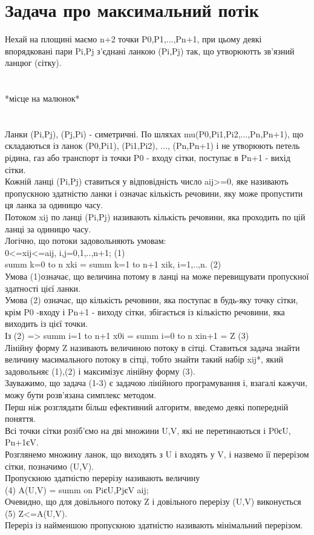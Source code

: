 \documentclass[12pt,a4paper]{book}
\begin{document}
\section{Задача про максимальний потік}
Нехай на площині маємо n+2 точки P0,P1,...,Pn+1, при цьому деякі впорядковані пари Pi,Pj з’єднані ланкою (Pi,Pj) так, що утворюютть зв’язний ланцюг (сітку).\\
\\
\\
*місце на малюнок*\\
\\
\\
Ланки (Pi,Pj), (Pj,Pi) - симетричні.
По шляхах mu(P0,Pi1,Pi2,...,Pn,Pn+1), що складаються із ланок (P0,Pi1), (Pi1,Pi2), ..., (Pn,Pn+1) і не утворюють петель рідина, газ або транспорт із точки P0 - входу сітки, поступає в Pn+1 - вихід сітки.\\
Кожній ланці (Pi,Pj) ставиться у відповідність число aij>=0, яке називають пропускною здатністю ланки і означає кількість речовини, яку може пропустити ця ланка за одиницю часу.\\
Потоком xij по ланці (Pi,Pj) називають кількість речовини, яка проходить по цій ланці за одиницю часу.\\
Логічно, що потоки задовольняють умовам:\\
0<=xij<=aij, i,j=0,1,..,n+1; (1)\\
summ k=0 to n xki = summ k=1 to n+1 xik, i=1,..,n. (2)\\
Умова (1)означає, що величина потому в ланці на може перевищувати пропускної здатності цієї ланки.\\
Умова (2) означає, що кількість речовини, яка поступає в будь-яку точку сітки, крім P0 -входу і Pn+1 - виходу сітки, збігається із кількістю речовини, яка виходить із цієї точки.\\
Із (2) => summ i=1 to n+1 x0i = summ i=0 to n xin+1 = Z (3)\\
Лінійну форму Z називають величиною потоку в сітці. Ставиться задача знайти величину масимального потоку в сітці, тобто знайти такий набір xij*, який задовольняє (1),(2) і максимізує лінійну форму (3).\\
Зауважимо, що задача (1-3) є задачою лінійного програмування і, взагалі кажучи, можу бути розв’язана симплекс методом.\\
Перш ніж розглядати більш ефективний алгоритм, введемо деякі попередній поняття.\\
Всі точки сітки розіб’ємо на дві множини U,V, які не перетинаються і P0єU, Pn+1єV.\\
Розглянемо множину ланок, що виходять з U і входять у V, і назвемо її перерізом сітки, позначимо (U,V).\\
Пропускною здатністю перерізу називають величину\\
(4) A(U,V) = summ on PiєU,PjєV aij;\\
Очевидно, що для довільного потоку Z і довільного перерізу (U,V) виконується\\
(5) Z<=A(U,V).\\
Переріз із найменшою пропускною здатністю називають мінімальний перерізом.\\
\end{document}
